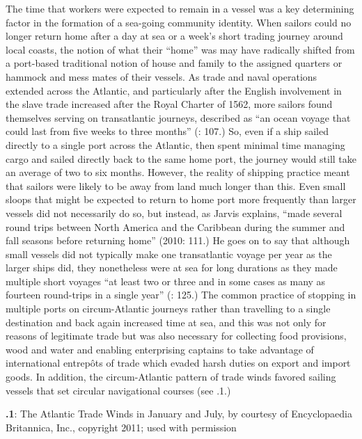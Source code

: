 The time that workers were expected to remain in a vessel was a key determining factor in the formation of a sea-going community identity. When sailors could no longer return home after a day at sea or a week’s short trading journey around local coasts, the notion of what their “home” was may have radically shifted from a port-based traditional notion of house and family to the assigned quarters or hammock and mess mates of their vessels. As trade and naval operations extended across the Atlantic, and particularly after the English involvement in the slave trade increased after the Royal Charter of 1562, more sailors found themselves serving on transatlantic journeys, described as “an ocean voyage that could last from five weeks to three months” (\citealt{Brown2011}: 107.) So, even if a ship sailed directly to a single port across the Atlantic, then spent minimal time managing cargo and sailed directly back to the same home port, the journey would still take an average of two to six months. However, the reality of shipping practice meant that sailors were likely to be away from land much longer than this. Even small sloops that might be expected to return to home port more frequently than larger vessels did not necessarily do so, but instead, as Jarvis explains, “made several round trips between North America and the Caribbean during the summer and fall seasons before returning home” (2010: 111.)  He goes on to say that although small vessels did not typically make one transatlantic voyage per year as the larger ships did, they nonetheless were at sea for long durations as they made multiple short voyages “at least two or three and in some cases as many as fourteen round-trips in a single year” (\citealt{Jarvis2010}: 125.) The common practice of stopping in multiple ports on circum-Atlantic journeys rather than travelling to a single destination and back again increased time at sea, and this was not only for reasons of legitimate trade but was also necessary for collecting food provisions, wood and water and enabling enterprising captains to take advantage of international entrepôts of trade which evaded harsh duties on export and import goods. In addition, the circum-Atlantic pattern of trade winds favored sailing vessels that set circular navigational courses (see .1.) 

 

\textbf{.1}: The Atlantic Trade Winds in January and July, by courtesy of Encyclopaedia Britannica, Inc., copyright 2011; used with permission

